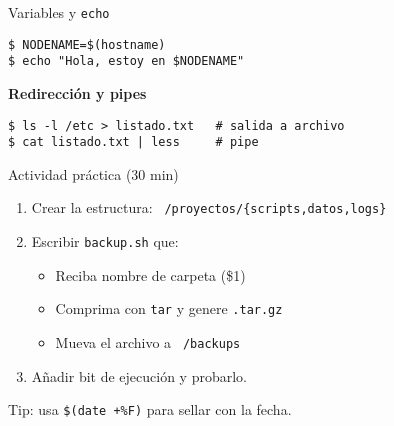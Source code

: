 \documentclass[aspectratio=169, professionalfonts]{beamer}
\begin{document}
\begin{frame}{Variables y \texttt{echo}}
\begin{lstlisting}[style=shell]
$ NODENAME=$(hostname)
$ echo "Hola, estoy en $NODENAME"
\end{lstlisting}
\pause
\textbf{Redirección y pipes}
\begin{lstlisting}[style=shell]
$ ls -l /etc > listado.txt   # salida a archivo
$ cat listado.txt | less     # pipe
\end{lstlisting}
\end{frame}

\begin{frame}{Actividad práctica (30 min)}
\begin{enumerate}
  \item Crear la estructura:\newline
        \texttt{~/proyectos/\{scripts,datos,logs\}}
  \item Escribir \texttt{backup.sh} que:
    \begin{itemize}
      \item Reciba nombre de carpeta (\$1)
      \item Comprima con \texttt{tar} y genere \texttt{.tar.gz}
      \item Mueva el archivo a \texttt{~/backups}
    \end{itemize}
  \item Añadir bit de ejecución y probarlo.
\end{enumerate}
\pause
\small{} Tip: usa \texttt{\$(date +\%F)} para sellar con la fecha.
\end{frame}
\end{document}
